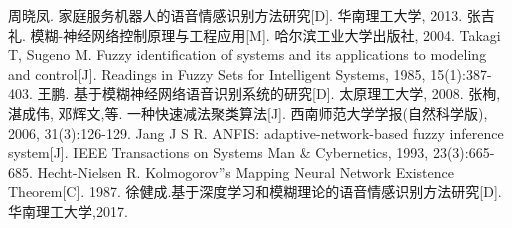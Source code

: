 \documentclass[12pt, a4paper]{article}
\begin{document}
\begin{thebibliography}{4}
	周晓凤. 家庭服务机器人的语音情感识别方法研究[D]. 华南理工大学, 2013.
	张吉礼. 模糊-神经网络控制原理与工程应用[M]. 哈尔滨工业大学出版社, 2004.
	Takagi T, Sugeno M. Fuzzy identification of systems and its applications to modeling and control[J]. Readings in Fuzzy Sets for Intelligent Systems, 1985, 15(1):387-403.
	王鹏. 基于模糊神经网络语音识别系统的研究[D]. 太原理工大学, 2008.
	张栒, 湛成伟, 邓辉文,等. 一种快速减法聚类算法[J]. 西南师范大学学报(自然科学版), 2006, 31(3):126-129.
	Jang J S R. ANFIS: adaptive-network-based fuzzy inference system[J]. IEEE Transactions on Systems Man \& Cybernetics, 1993, 23(3):665-685.
	Hecht-Nielsen R. Kolmogorov''s Mapping Neural Network Existence Theorem[C]. 1987.
	徐健成.基于深度学习和模糊理论的语音情感识别方法研究[D].华南理工大学,2017.
\end{thebibliography}


\end{document}
